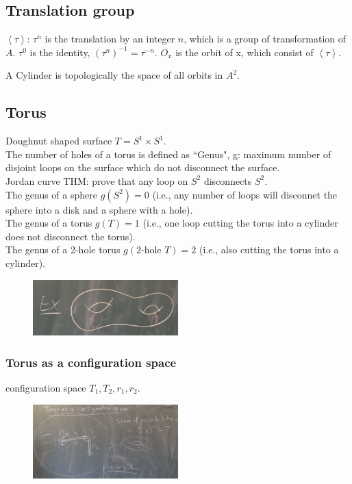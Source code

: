 \documentclass[12pt]{article}
\begin{document}
\subsection{Translation group}
$\left< \tau \right>$: $\tau^n$ is the translation by an integer $n$, which is a group of transformation of $A$.
$\tau^0$ is the identity, $(\tau^n)^{-1}=\tau^{-n}$.
$O_x$ is the orbit of x, which consist of $\left< \tau \right>$.

A Cylinder is topologically the space of all orbits in $A^2$.

\subsection{Torus}
Doughnut shaped surface $T= S^1 \times S^1$. \\

The number of holes of a torus is defined as ``Genus", g: maximum number of disjoint loops on the surface which do not disconnect the surface. \\

Jordan curve THM: prove that any loop on $S^2$ disconnects $S^2$. \\

The genus of a sphere $g(S^2)= 0$ (i.e., any number of loops will disconnet the sphere into a disk and a sphere with a hole). \\
The genus of a torus $g(T)= 1$ (i.e., one loop cutting the torus into a cylinder does not disconnect the torus). \\
The genus of a 2-hole torus $g(\text{2-hole } T)= 2$ (i.e., also cutting the torus into a cylinder).
  \begin{figure}[H]
     \includegraphics[width=0.5\textwidth]{twoholeT}
  \end{figure}

\subsubsection{Torus as a configuration space}
configuration space $T_1, T_2, r_1, r_2$.
  \begin{figure}[H]
    \includegraphics[width=0.5\textwidth]{torus_config_space}
  \end{figure}
    
\end{document}
